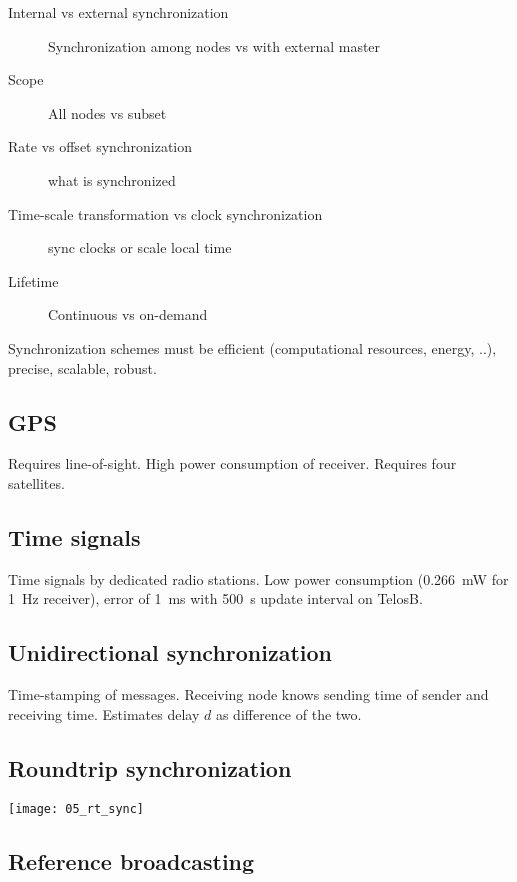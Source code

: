 \begin{description}
		\item[Internal vs external synchronization] Synchronization among nodes vs with external master
		\item[Scope] All nodes vs subset
		\item[Rate vs offset synchronization] what is synchronized
		\item[Time-scale transformation vs clock synchronization] sync clocks or scale local time
		\item[Lifetime] Continuous vs on-demand
\end{description}

Synchronization schemes must be efficient (computational resources, energy,
..), precise, scalable, robust.

\subsection{GPS}

Requires line-of-sight. High power consumption of receiver. Requires four satellites.

\subsection{Time signals}

Time signals by dedicated radio stations. Low power consumption
(\SI{0.266}{\milli\watt} for \SI{1}{\hertz} receiver), error of
\SI{1}{\milli\second} with \SI{500}{\second} update interval on TelosB.

\subsection{Unidirectional synchronization}

Time-stamping of messages. Receiving node knows sending time of sender and
receiving time. Estimates delay $d$ as difference of the two.

\subsection{Roundtrip synchronization}

\texttt{[image: 05\_rt\_sync]}

\subsection{Reference broadcasting}

